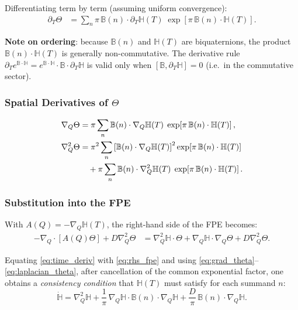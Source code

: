 \documentclass[12pt]{article}
\theoremstyle{definition}
\theoremstyle{remark}
\begin{document}
Differentiating term by term (assuming uniform convergence):
\begin{align}
  \partial_T \Theta
  &= \sum_n \pi\,\mathbb{B}(n)\cdot\partial_T\mathbb{H}(T)\;
     \exp\!\left[\pi\,\mathbb{B}(n)\cdot\mathbb{H}(T)\right].
  \label{eq:time_deriv}
\end{align}

\noindent
\textbf{Note on ordering}: because $\mathbb{B}(n)$ and $\mathbb{H}(T)$ are biquaternions,
the product $\mathbb{B}(n)\cdot\mathbb{H}(T)$ is generally non-commutative.
The derivative rule $\partial_T e^{\mathbb{B}\cdot\mathbb{H}} = e^{\mathbb{B}\cdot\mathbb{H}}\cdot
\mathbb{B}\cdot\partial_T\mathbb{H}$ is valid only when $[\mathbb{B},\partial_T\mathbb{H}]=0$
(i.e.\ in the commutative sector).

\subsubsection{Spatial Derivatives of $\Theta$}

\begin{align}
  \nabla_Q \Theta
  &= \pi \sum_n \mathbb{B}(n)\cdot\nabla_Q\mathbb{H}(T)\;
     \exp\!\left[\pi\,\mathbb{B}(n)\cdot\mathbb{H}(T)\right],
  \label{eq:grad_theta}\\
  \nabla_Q^2 \Theta
  &= \pi^2 \sum_n \left[\mathbb{B}(n)\cdot\nabla_Q\mathbb{H}(T)\right]^2
     \exp\!\left[\pi\,\mathbb{B}(n)\cdot\mathbb{H}(T)\right] \notag\\
  &\quad + \pi \sum_n \mathbb{B}(n)\cdot\nabla_Q^2\mathbb{H}(T)\;
     \exp\!\left[\pi\,\mathbb{B}(n)\cdot\mathbb{H}(T)\right].
  \label{eq:laplacian_theta}
\end{align}

\subsubsection{Substitution into the FPE}

With $A(Q) = -\nabla_Q\mathbb{H}(T)$, the right-hand side of the FPE becomes:
\begin{align}
  -\nabla_Q\cdot[A(Q)\Theta] + D\nabla_Q^2\Theta
  &= \nabla_Q^2\mathbb{H}\cdot\Theta
     + \nabla_Q\mathbb{H}\cdot\nabla_Q\Theta
     + D\nabla_Q^2\Theta.
  \label{eq:rhs_fpe}
\end{align}

Equating \eqref{eq:time_deriv} with \eqref{eq:rhs_fpe} and using \eqref{eq:grad_theta}--\eqref{eq:laplacian_theta}, after cancellation of the common exponential factor, one obtains a \emph{consistency condition} that $\mathbb{H}(T)$ must satisfy for each summand $n$:
\begin{equation}
  \boxed{
  \dot{\mathbb{H}}
  = \nabla_Q^2\mathbb{H}
  + \frac{1}{\pi}\,\nabla_Q\mathbb{H}\cdot\mathbb{B}(n)\cdot\nabla_Q\mathbb{H}
  + \frac{D}{\pi}\,\mathbb{B}(n)\cdot\nabla_Q\mathbb{H}.
  }
  \label{eq:consistency}
\end{equation}
\end{document}
